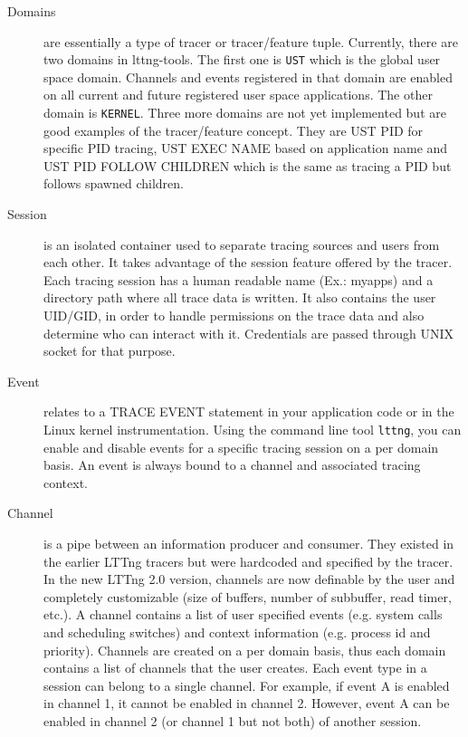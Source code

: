 \begin{description}

\item[Domains] 
are essentially a type of tracer or tracer/feature tuple.  Currently, there are
two domains in lttng-tools. The first one is \texttt{UST} which is the global
user space domain. Channels and events registered in that domain are enabled on
all current and future registered user space applications. The other domain is
\texttt{KERNEL}.  Three more domains are not yet implemented but are good
examples of the tracer/feature concept. They are UST PID for specific PID
tracing, UST EXEC NAME based on application name and UST PID FOLLOW CHILDREN
which is the same as tracing a PID but follows spawned children.

\item[Session]
is an isolated container used to separate tracing sources and users from each
other. It takes advantage of the session feature offered by the tracer.  Each
tracing session has a human readable name (Ex.: myapps) and a directory path
where all trace data is written. It also contains the user UID/GID, in order to
handle permissions on the trace data and also determine who can
interact with it. Credentials are passed through UNIX socket for that purpose.

\item[Event] 
relates to a TRACE EVENT statement in your application code or in the Linux
kernel instrumentation.  Using the command line tool \texttt{lttng}, you can
enable and disable events for a specific tracing session on a per domain basis.
An event is always bound to a channel and associated tracing context.

\item[Channel]
is a pipe between an information producer and consumer. They existed in the
earlier LTTng tracers but were hardcoded and specified by the tracer. In the
new LTTng 2.0 version, channels are now definable by the user and completely
customizable (size of buffers, number of subbuffer, read timer, etc.).  A
channel contains a list of user specified events (e.g. system calls and
scheduling switches) and context information (e.g. process id and priority).
Channels are created on a per domain basis, thus each domain contains a list of
channels that the user creates.  Each event type in a session can belong to a
single channel. For example, if event A is enabled in channel 1, it cannot be
enabled in channel 2. However, event A can be enabled in channel 2 (or channel
1 but not both) of another session.

\end{description}

